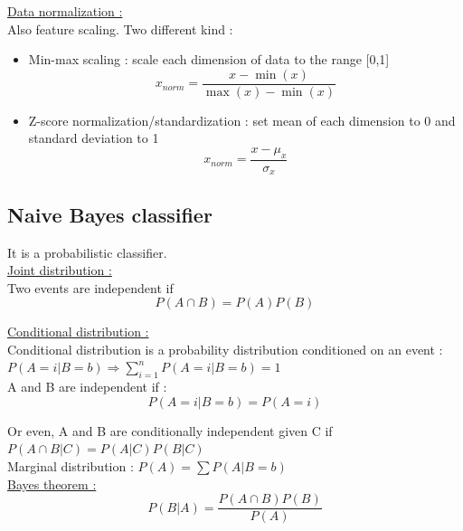 \documentclass[../main.tex]{subfiles}
\begin{document}
\quad \underline{Data normalization :}\\
Also feature scaling. Two different kind : \begin{itemize}
    \item Min-max scaling : scale each dimension of data to the range [0,1] \begin{equation}
        x_{norm} = \frac{x-\min(x)}{\max(x)-\min(x)}
    \end{equation}
    \item Z-score normalization/standardization : set mean of each dimension to 0 and standard deviation to 1 \begin{equation}
        x_{norm} = \frac{x-\mu_x}{\sigma_x}
    \end{equation}
\end{itemize}

\subsection{Naive Bayes classifier}
It is a probabilistic classifier.\\

\quad \underline{Joint distribution :}\\
Two events are independent if \begin{equation}
    P(A\cap B) = P(A)P(B)
\end{equation}

\quad \underline{Conditional distribution :}\\
Conditional distribution is a probability distribution conditioned on an event : $P(A=i \lvert B=b) \Rightarrow \sum_{i=1}^n P(A=i \lvert B=b) = 1$\\

A and B are independent if  : \begin{equation}
    P(A=i \lvert B=b) = P(A=i)
\end{equation}

Or even, A and B are conditionally independent given C if $P(A\cap B\lvert C) = P(A\lvert C) P(B\lvert C)$\\

Marginal distribution : $P(A) = \sum P(A \lvert B=b)$\\

\quad \underline{Bayes theorem :}\\
\begin{equation}
    P(B\lvert A) = \frac{P(A\cap B)P(B)}{P(A)}
\end{equation}
\end{document}
